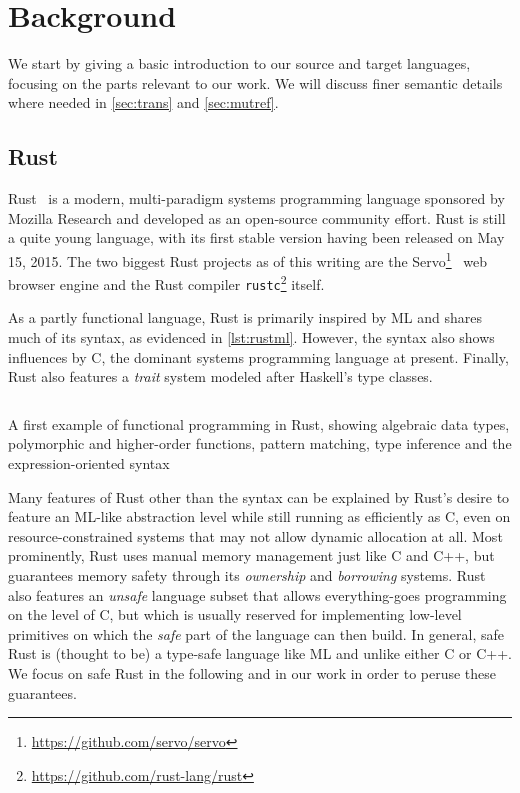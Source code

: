 \section{Background}
We start by giving a basic introduction to our source and target
languages, focusing on the parts relevant to our work. We will discuss finer
semantic details where needed in \autoref{sec:trans} and \autoref{sec:mutref}.

\subsection{Rust}
\label{sec:rust}

Rust~\cite{matsakis2014rust} is a modern, multi-paradigm systems programming language sponsored
by Mozilla Research and developed as an open-source community effort. Rust is still a quite young language, with its first stable
version having been released on May 15, 2015. The two biggest Rust projects as of
this writing are the Servo\footnote{\url{https://github.com/servo/servo}}~\cite{anderson2016engineering} web browser engine and
the Rust compiler \texttt{rustc}\footnote{\url{https://github.com/rust-lang/rust}} itself.

As a partly functional language, Rust is primarily inspired by ML and shares much of
its syntax, as evidenced in \autoref{lst:rustml}. However, the syntax also shows
influences by C, the dominant systems programming language at present.
Finally, Rust also features a \emph{trait} system modeled after Haskell's type classes.

\begin{listing}[!bp]
  \inputminted{rust}{code/rustml.rs}
  
  \caption{A first example of functional programming in Rust, showing algebraic
    data types, polymorphic and higher-order functions, pattern matching, type
    inference and the expression-oriented syntax}
  \label{lst:rustml}
\end{listing}

Many features of Rust other than the syntax can be explained by Rust's desire to
feature an ML-like abstraction level while still running as efficiently as C,
even on resource-constrained systems that may not allow dynamic allocation at all.
Most prominently, Rust uses manual memory management just like C and C++, but
guarantees memory safety through its \emph{ownership} and
\emph{borrowing} systems. Rust also features an \emph{unsafe} language subset that allows
everything-goes programming on the level of C, but which is usually reserved for
implementing low-level primitives on which the \emph{safe} part of the language can
then build. In general, safe Rust is (thought to be) a type-safe
language like ML and unlike either C or C++. We focus on safe Rust in the
following and in our work in order to peruse these guarantees.

